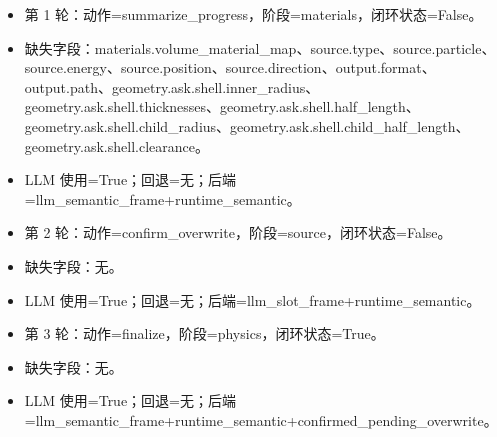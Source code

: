 \documentclass[11pt]{ctexart}
\begin{document}
\begin{itemize}
\item 第 1 轮：动作=summarize\_progress，阶段=materials，闭环状态=False。
\item 缺失字段：materials.volume\_material\_map、source.type、source.particle、source.energy、source.position、source.direction、output.format、output.path、geometry.ask.shell.inner\_radius、geometry.ask.shell.thicknesses、geometry.ask.shell.half\_length、geometry.ask.shell.child\_radius、geometry.ask.shell.child\_half\_length、geometry.ask.shell.clearance。
\item LLM 使用=True；回退=无；后端=llm\_semantic\_frame+runtime\_semantic。
\item 第 2 轮：动作=confirm\_overwrite，阶段=source，闭环状态=False。
\item 缺失字段：无。
\item LLM 使用=True；回退=无；后端=llm\_slot\_frame+runtime\_semantic。
\item 第 3 轮：动作=finalize，阶段=physics，闭环状态=True。
\item 缺失字段：无。
\item LLM 使用=True；回退=无；后端=llm\_semantic\_frame+runtime\_semantic+confirmed\_pending\_overwrite。
\end{itemize}
\end{document}
